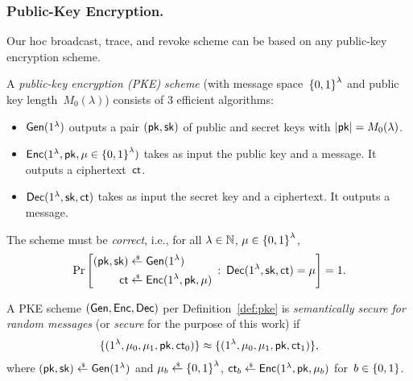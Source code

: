 \subsubsection{Public-Key Encryption.}
Our \ad hoc broadcast, trace, and revoke scheme can be based on any public-key encryption scheme.

\begin{definition}[PKE]\label{def:pke}
A \emph{public-key encryption (PKE) scheme} (with message space~${\{0,1\}}^\lambda$ and public key length~$M_0(\lambda)$)
consists of 3 efficient algorithms:
\begin{itemize}
\item $\Gen(1^\lambda)$ outputs a pair $(\pk,\sk)$ of public and secret keys
with ${|\pk|=M_0(\lambda)}$.
\item $\Enc(1^\lambda,\pk,\mu\in\bit^\lambda)$ takes as input the public key and a message.
It outputs a ciphertext~$\ct$.
\item $\Dec(1^\lambda,\sk,\ct)$ takes as input the secret key and a ciphertext.
It outputs a message.
\end{itemize}
The scheme must be \emph{correct}, i.e., for all
${\lambda\in{\mathbb{N}}}$,
${\mu\in{\{0,1\}}^\lambda}$,
\begin{align*}
\Pr\left[
\begin{aligned}
(\pk,\sk)&{}\draws\Gen(1^\lambda)\\
\ct&{}\draws\Enc(1^\lambda,\pk,\mu)
\end{aligned}
\::\:
\Dec(1^\lambda,\sk,\ct)=\mu
\right]=1.
\end{align*}
\end{definition}

\begin{definition}\label{def:pke-security}
A PKE scheme $(\Gen,\Enc,\Dec)$ per Definition~\ref{def:pke} is \emph{semantically secure for random messages} (or \emph{secure} for the purpose of this work) if
\begin{align*}
\{(1^\lambda,\mu_0,\mu_1,\pk,\ct_0)\}\approx\{(1^\lambda,\mu_0,\mu_1,\pk,\ct_1)\},
\end{align*}
where $(\pk,\sk)\draws\Gen(1^\lambda)$ and
${\mu_b\draws\bit^\lambda}$, ${\ct_b\draws\Enc(1^\lambda,\pk,\mu_b)}$ for~${b\in{\{0,1\}}}$.
\end{definition}
